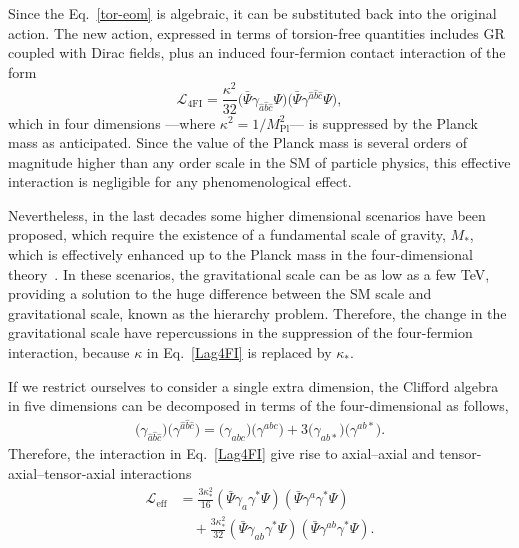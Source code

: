 \documentclass{ws-mpla}
\newcommand{\ga}{\gamma}
\newcommand{\Lag}{\mathscr{L}}
\renewcommand{\(}{\left(}
\renewcommand{\)}{\right)}
\renewcommand{\[}{\left[}
\renewcommand{\]}{\right]}
\begin{document}
Since the  Eq.~\eqref{tor-eom} is algebraic, it can be substituted back into the original action. The new action, expressed in terms of torsion-free quantities includes GR coupled with Dirac fields, plus an  induced four-fermion contact interaction of the form
\begin{equation}
  \Lag_{\text{4FI}} = \frac{\kappa^2}{32} \big( \bar{\Psi}\ga_{\hat{a} \hat{b} \hat{c}}\Psi \big)  \big( \bar{\Psi}\ga^{\hat{a} \hat{b} \hat{c}}\Psi \big),
  \label{Lag4FI}
\end{equation}
which in four dimensions ---where $\kappa^2 = {1}/{M_{\text{Pl}}^2}$--- is suppressed by the Planck mass as anticipated. Since the value of the Planck mass is several orders of magnitude higher than any order scale in the SM of particle physics, this effective interaction is negligible for any phenomenological effect.

Nevertheless, in the last decades some higher dimensional scenarios have been proposed, which require the existence of a fundamental scale of gravity, $M_*$, which is effectively enhanced up to the Planck mass in the four-dimensional theory~\cite{ADD1,AADD,ADD2,RS1,RS2}. In these scenarios, the gravitational scale can be as low as a few \si{\TeV}, providing a solution to the huge difference between the SM scale and gravitational scale, known as the hierarchy problem. Therefore, the change in the gravitational scale have repercussions in the suppression of the four-fermion interaction, because $\kappa$ in Eq.~\eqref{Lag4FI} is replaced by $\kappa_*$.

If we restrict ourselves to consider a single extra dimension, the Clifford algebra in five dimensions can be decomposed in terms of the four-dimensional as follows,
\begin{align}
  \big(\ga_{\hat{a} \hat{b} \hat{c}}\big) \big(\ga^{\hat{a} \hat{b} \hat{c}}\big) = \big(\ga_{a b c}\big)\big(\ga^{a b c}\big) + 3 \big(\ga_{a b *}\big)\big(\ga^{a b *}\big).
  \label{Cliff-decomp}
\end{align}
Therefore, the interaction in Eq.~\eqref{Lag4FI} give rise to axial--axial and tensor-axial--tensor-axial interactions~\cite{Castillo-Felisola:2013jva}
\begin{equation}
  \begin{split}
    \Lag_{\text{eff}}
    & = \frac{3 \kappa_*^2}{16} \( \bar{\Psi} \ga_{a}\ga^* \Psi \) \( \bar{\Psi} \ga^{a}\ga^* \Psi \) \\
    & \quad + \frac{3 \kappa_*^2}{32} \( \bar{\Psi} \ga_{a b}\ga^* \Psi \) \( \bar{\Psi} \ga^{a b}\ga^* \Psi \).
  \end{split}
  \label{Eff4fi}
\end{equation}
\end{document}
